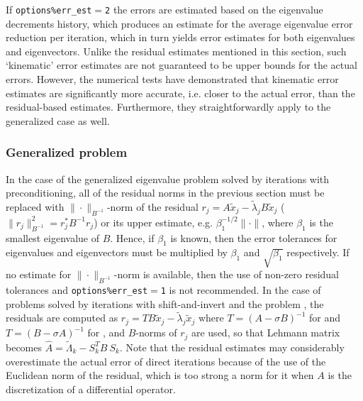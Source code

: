 If {\tt options\%err\_est$=$2}
the errors are estimated
based on the eigenvalue decrements history,
which produces an estimate for the average 
eigenvalue error reduction per iteration,
which in turn yields error estimates
for both eigenvalues and eigenvectors.
Unlike the residual estimates mentioned in this section, 
such `kinematic' error estimates are
not guaranteed to be upper bounds for the actual errors.
However, the numerical tests have demonstrated
that kinematic error estimates 
are significantly more accurate,
i.e. closer to the actual error,
than the residual-based estimates. 
Furthermore, they straightforwardly
apply to the generalized case as well.

\subsubsection{Generalized problem}

In the case
of the generalized eigenvalue problem 
solved by iterations with preconditioning,
all of the residual norms in the previous section must be replaced
with %
$\|\cdot\|_{B^{-1}}$-norm of the residual
$r_j = A \tilde x_j - \tilde\lambda_j B \tilde x_j$
($\|r_j\|_{B^{-1}}^2 = r_j^* B^{-1} r_j$)
or its upper estimate, e.g. 
$\beta_1^{-1/2}\|\cdot\|$,
where $\beta_1$ is the smallest eigenvalue of $B$.
Hence, if $\beta_1$ is known, then
the error tolerances for eigenvalues and eigenvectors
must be multiplied by $\beta_1$ and $\sqrt{\beta_1}$
respectively. If no estimate for $\|\cdot\|_{B^{-1}}$-norm
is available, then the use of
non-zero residual tolerances and
{\tt options\%err\_est$=$1}
is not recommended.
In the case of problems  solved by 
iterations with shift-and-invert
and the problem ,
the residuals are computed as
$r_j = T B \tilde x_j - \tilde \lambda_j \tilde x_j$
where
$T = (A - \sigma B)^{-1}$ for  and
$T = (B - \sigma A)^{-1}$ for ,
and $B$-norms of $r_j$ are used, so that
Lehmann matrix becomes
$\hat A = \tilde\Lambda_k - S_k^T B\ S_k$.
Note that the residual estimates 
may considerably overestimate the actual error of direct iterations
because  of the use of the Euclidean norm of the residual,
which is too strong a norm for it
when $A$ is the discretization of a differential operator.
\fi


